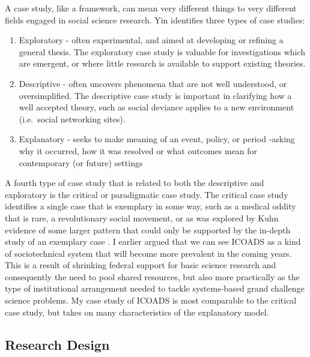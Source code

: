 \documentclass[thesis,tocnosub,noragright,centerchapter,12pt]{uiucecethesis09}
\begin{document}
{A case study, like a framework, can mean very different things to very
different fields engaged in social science research. Yin identifies three types of case studies:\\

\begin{enumerate}
\def\labelenumi{\arabic{enumi}.}
\itemsep1pt\parskip0pt
\item
  Exploratory - often experimental, and aimed at developing or refining
  a general thesis. The exploratory case study is valuable for
  investigations which are emergent, or where little research is
  available to support existing theories.\\
\item
  Descriptive - often uncovers phenomena that are not well understood,
  or oversimplified. The descriptive case study is important in
  clarifying how a well accepted theory, such as social deviance \citep{becker1967whose} applies to a
  new environment (i.e.~social networking sites).
\item
  Explanatory - seeks to make meaning of an event, policy, or period
  -asking why it occurred, how it was resolved or what outcomes mean for
  contemporary (or future) settings \citeyearpar{yin2003case}
\end{enumerate}

A fourth type of case study that is related to both the descriptive and exploratory is the
critical or paradigmatic case study. The critical case study identifies a single case that
is exemplary in some way, such as a medical oddity that is rare, a
revolutionary social movement, or as was explored by Kuhn evidence of
some larger pattern that could only be supported by the in-depth study of an
exemplary case \citep{kuhn1962structur, flyvbjerg2006five}. I earlier argued that we
can see ICOADS as a kind of sociotechnical
system that will become more prevalent in the coming years. This is a
result of shrinking federal support for basic science research and
consequently the need to pool shared resources, but also more
practically as the type of institutional arrangement needed to tackle
systems-based grand challenge science problems. My case study of ICOADS is most comparable to the critical case study, but takes on many
characteristics of the explanatory model.\\

\subsection*{Research Design}

}
\end{document}
